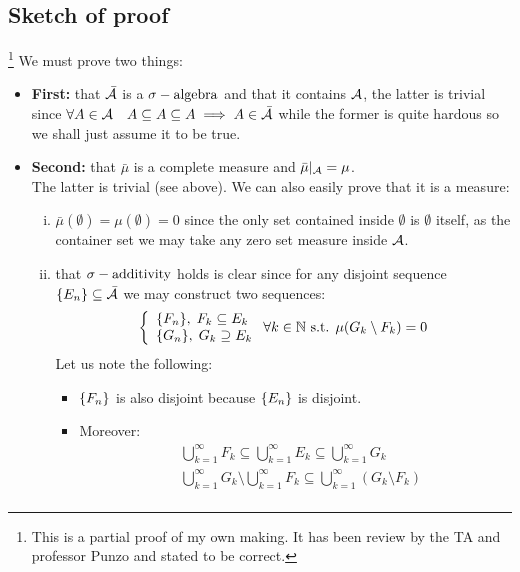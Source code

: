 \subsection*{Sketch of proof} \footnote{
    This is a partial proof of my own making. It has been review by the TA and professor Punzo and stated to be correct.
}
We  must prove two things:
\begin{itemize}
    \item \textbf{First:} that $\bar{\mathcal{A}}$ is a $\sigma-\text{algebra}$ and that it contains $\mathcal{A}$, the latter is trivial since $\forall A\in\mathcal{A} \quad A\subseteq A\subseteq A \implies A\in\bar{\mathcal{A}}$ while the former is quite hardous so we shall just assume it to be true.
    \item \textbf{Second:} that $\bar{\mu}$ is a complete measure and $\bar{\mu}|_{\mathcal{A}}=\mu$.\\
          The latter is trivial (see above). We can also easily prove that it is a measure:
          \begin{enumerate}[i)]
              \item $\bar{\mu}(\emptyset)=\mu(\emptyset)=0$ since the only set contained inside $\emptyset$ is $\emptyset$ itself, as the container set we may take any zero set measure inside $\mathcal{A}$.
              \item that $\sigma-\text{additivity}$ holds is clear since for any disjoint sequence $\{ E_n \}\subseteq\bar{\mathcal{A}}$ we may construct two sequences:
                    \[
                        \left\{ \begin{array}{l}
                            \{ F_n \}, \; F_k \subseteq E_k \\
                            \{ G_n \}, \; G_k \supseteq E_k
                        \end{array} \right. \forall k\in\mathbb{N} \text{ s.t. } \mu(G_k\setminus F_k) = 0
                    \]
                    Let us note the following:
                    \begin{itemize}
                        \item $\{ F_n \}$ is also disjoint because $\{ E_n \}$ is disjoint.
                        \item Moreover:
                              \begin{align*}
                                   & \bigcup_{k=1}^{\infty} F_k \subseteq \bigcup_{k=1}^{\infty} E_k \subseteq \bigcup_{k=1}^{\infty} G_k                                                                                                 \\
                                   & \bigcup_{k=1}^{\infty} G_k \setminus \bigcup_{k=1}^{\infty} F_k \subseteq \bigcup_{k=1}^{\infty} (G_k \setminus F_k )                                                                                \\

\end{align*}
\end{itemize}
\end{enumerate}
\end{itemize}
